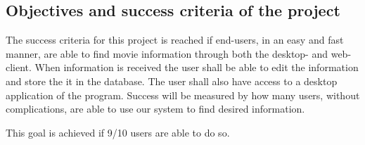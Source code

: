 \subsection{Objectives and success criteria of the project}

The success criteria for this project is reached if end-users, in an easy and fast manner, are able to find movie information through both the desktop- and web-client. When information is received the user shall be able to edit the information and store the it in the database. The user shall also have access to a desktop application of the program. Success will be measured by how many users, without complications, are able to use our system to find desired information.

This goal is achieved if 9/10 users are able to do so.



